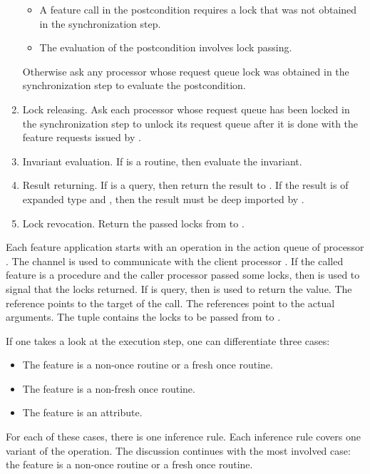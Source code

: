 \begin{enumerate}
		\begin{itemize}
			\item A feature call in the postcondition requires a lock that was not obtained in the synchronization step.
			\item The evaluation of the postcondition involves lock passing.
		\end{itemize}
		Otherwise ask any processor whose request queue lock was obtained in the synchronization step to evaluate the postcondition.
	\item Lock releasing. Ask each processor whose request queue has been locked in the synchronization step to unlock its request queue after it is done with the feature requests issued by .
	\item Invariant evaluation. If  is a routine, then evaluate the invariant.
	\item Result returning. If  is a query, then return the result to . If the result is of expanded type and , then the result must be deep imported by .
	\item Lock revocation. Return the passed locks from  to .
\end{enumerate}
Each feature application starts with an operation  in the action queue of processor . The channel  is used to communicate with the client processor . If the called feature  is a procedure and the caller processor  passed some locks, then  is used to signal that the locks returned. If  is query, then  is used to return the value. The reference  points to the target of the call. The references  point to the actual arguments. The tuple  contains the locks to be passed from  to .

If one takes a look at the execution step, one can differentiate three cases:
\begin{itemize}
	\item The feature  is a non-once routine or a fresh once routine.
	\item The feature  is a non-fresh once routine.
	\item The feature  is an attribute.
\end{itemize}
For each of these cases, there is one inference rule. Each inference rule covers one variant of the  operation. The discussion continues with the most involved case: the feature  is a non-once routine or a fresh once routine.

